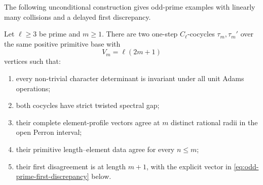 The following unconditional construction gives odd-prime examples with
linearly many collisions and a delayed first discrepancy.

\begin{theorem}
\label{thm:odd-prime-delayed-multicollisions}
Let \(\ell\ge3\) be prime and \(m\ge1\).  There are two one-step
\(C_\ell\)-cocycles \(\tau_m,\tau_m'\) over the same positive primitive base
with
\[
 V_m=\ell(2m+1)
\]
vertices such that:
\begin{enumerate}[label=\textup{(\roman*)},leftmargin=*]
 \item every non-trivial character determinant is invariant under all unit
 Adams operations;
 \item both cocycles have strict twisted spectral gap;
 \item their complete element-profile vectors agree at \(m\) distinct
 rational radii in the open Perron interval;
 \item their primitive length--element data agree for every \(n\le m\);
 \item their first disagreement is at length \(m+1\), with the explicit
 vector in \eqref{eq:odd-prime-first-discrepancy} below.
\end{enumerate}
\end{theorem}


